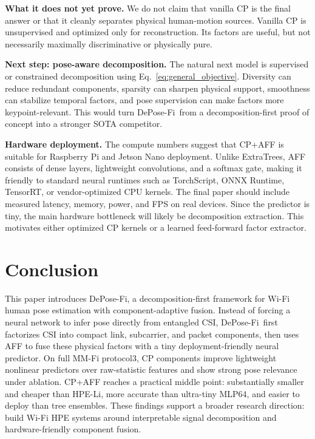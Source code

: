 \documentclass[letterpaper]{article}
\newcommand{\method}{DePose-Fi}
\begin{document}
\textbf{What it does not yet prove.}
We do not claim that vanilla CP is the final answer or that it cleanly separates physical human-motion sources. Vanilla CP is unsupervised and optimized only for reconstruction. Its factors are useful, but not necessarily maximally discriminative or physically pure.

\textbf{Next step: pose-aware decomposition.}
The natural next model is supervised or constrained decomposition using Eq.~\ref{eq:general_objective}. Diversity can reduce redundant components, sparsity can sharpen physical support, smoothness can stabilize temporal factors, and pose supervision can make factors more keypoint-relevant. This would turn \method\ from a decomposition-first proof of concept into a stronger SOTA competitor.

\textbf{Hardware deployment.}
The compute numbers suggest that CP+AFF is suitable for Raspberry Pi and Jetson Nano deployment. Unlike ExtraTrees, AFF consists of dense layers, lightweight convolutions, and a softmax gate, making it friendly to standard neural runtimes such as TorchScript, ONNX Runtime, TensorRT, or vendor-optimized CPU kernels. The final paper should include measured latency, memory, power, and FPS on real devices. Since the predictor is tiny, the main hardware bottleneck will likely be decomposition extraction. This motivates either optimized CP kernels or a learned feed-forward factor extractor.

\section{Conclusion}

This paper introduces \method, a decomposition-first framework for Wi-Fi human pose estimation with component-adaptive fusion. Instead of forcing a neural network to infer pose directly from entangled CSI, \method\ first factorizes CSI into compact link, subcarrier, and packet components, then uses AFF to fuse these physical factors with a tiny deployment-friendly neural predictor. On full MM-Fi protocol3, CP components improve lightweight nonlinear predictors over raw-statistic features and show strong pose relevance under ablation. CP+AFF reaches a practical middle point: substantially smaller and cheaper than HPE-Li, more accurate than ultra-tiny MLP64, and easier to deploy than tree ensembles. These findings support a broader research direction: build Wi-Fi HPE systems around interpretable signal decomposition and hardware-friendly component fusion.
\end{document}
